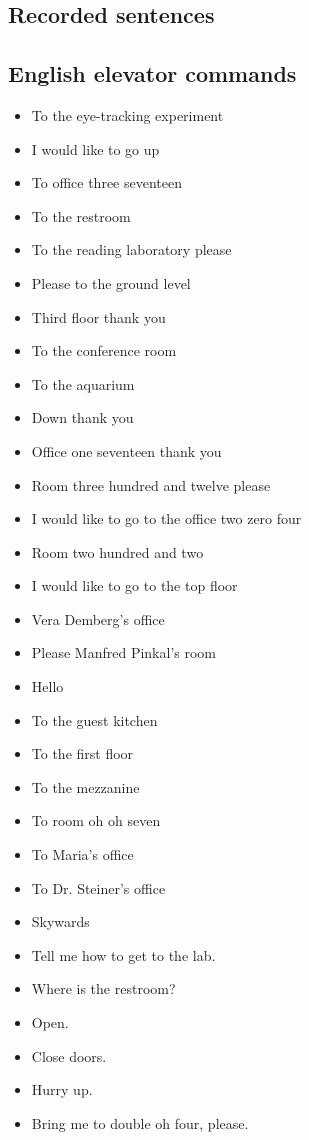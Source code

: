 \documentclass[a4paper, 12pt]{article}
\begin{document}
\cleardoublepage
\begin{appendix}
\section{Recorded sentences} \label{prompts}
\subsection{English elevator commands}
\begin{itemize}
\item To the eye-tracking experiment
\item I would like to go up
\item To office three seventeen
\item To the restroom
\item To the reading laboratory please
\item Please to the ground level
\item Third floor thank you
\item To the conference room
\item To the aquarium
\item Down thank you
\item Office one seventeen thank you
\item Room three hundred and twelve please
\item I would like to go to the office two zero four
\item Room two hundred and two
\item I would like to go to the top floor
\item Vera Demberg's office
\item Please Manfred Pinkal's room
\item Hello
\item To the guest kitchen
\item To the first floor
\item To the mezzanine
\item To room oh oh seven
\item To Maria's office
\item To Dr. Steiner's office
\item Skywards
\item Tell me how to get to the lab.
\item Where is the restroom?
\item Open.
\item Close doors.
\item Hurry up.
\item Bring me to double oh four, please.

\end{itemize}
\end{appendix}
\end{document}
